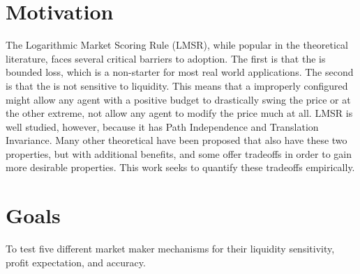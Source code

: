 \section{Motivation}
The Logarithmic Market Scoring Rule (LMSR), while popular in the theoretical
literature, faces several critical barriers to adoption. The first is that
the  is bounded loss, which is a non-starter for most
real world applications. The second is that the  is not
sensitive to liquidity. This means that a improperly configured 
might allow any agent with a positive budget to drastically swing the price or at
the other extreme, not allow any agent to modify the price much at all. LMSR is
well studied, however, because it has Path Independence and Translation Invariance.
Many other theoretical  have been proposed that also have
these two properties, but with additional benefits, and some offer tradeoffs in
order to gain more desirable properties. This work seeks to quantify these
tradeoffs empirically.

\section{Goals}
To test five different market maker mechanisms for their liquidity sensitivity,
profit expectation, and accuracy. 